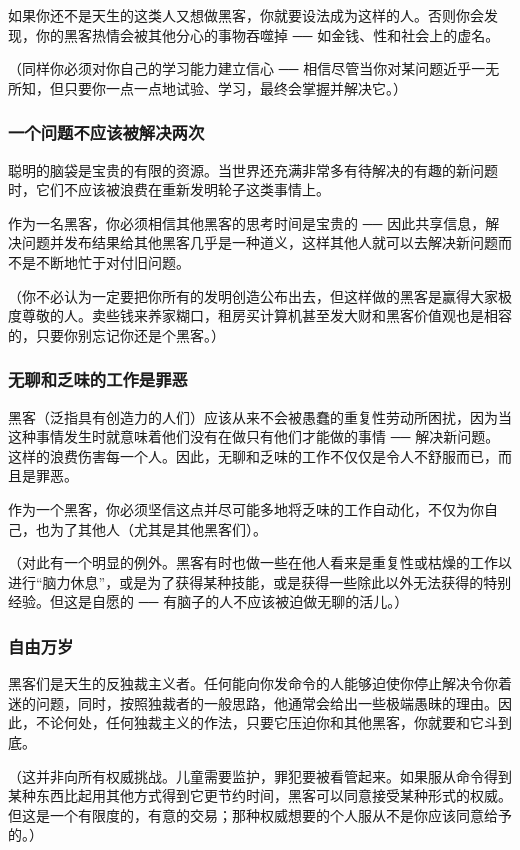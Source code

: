 如果你还不是天生的这类人又想做黑客，你就要设法成为这样的人。否则你会发现，你的黑客热情会被其他分心的事物吞噬掉 ── 如金钱、性和社会上的虚名。

（同样你必须对你自己的学习能力建立信心 ── 相信尽管当你对某问题近乎一无所知，但只要你一点一点地试验、学习，最终会掌握并解决它。）


\subsubsection{一个问题不应该被解决两次}
聪明的脑袋是宝贵的有限的资源。当世界还充满非常多有待解决的有趣的新问题时，它们不应该被浪费在重新发明轮子这类事情上。

作为一名黑客，你必须相信其他黑客的思考时间是宝贵的 ── 因此共享信息，解决问题并发布结果给其他黑客几乎是一种道义，这样其他人就可以去解决新问题而不是不断地忙于对付旧问题。

（你不必认为一定要把你所有的发明创造公布出去，但这样做的黑客是赢得大家极度尊敬的人。卖些钱来养家糊口，租房买计算机甚至发大财和黑客价值观也是相容的，只要你别忘记你还是个黑客。）


\subsubsection{无聊和乏味的工作是罪恶}
黑客（泛指具有创造力的人们）应该从来不会被愚蠢的重复性劳动所困扰，因为当这种事情发生时就意味着他们没有在做只有他们才能做的事情 ── 解决新问题。这样的浪费伤害每一个人。因此，无聊和乏味的工作不仅仅是令人不舒服而已，而且是罪恶。

作为一个黑客，你必须坚信这点并尽可能多地将乏味的工作自动化，不仅为你自己，也为了其他人（尤其是其他黑客们）。

（对此有一个明显的例外。黑客有时也做一些在他人看来是重复性或枯燥的工作以进行“脑力休息”，或是为了获得某种技能，或是获得一些除此以外无法获得的特别经验。但这是自愿的 ── 有脑子的人不应该被迫做无聊的活儿。）


\subsubsection{自由万岁}
黑客们是天生的反独裁主义者。任何能向你发命令的人能够迫使你停止解决令你着迷的问题，同时，按照独裁者的一般思路，他通常会给出一些极端愚昧的理由。因此，不论何处，任何独裁主义的作法，只要它压迫你和其他黑客，你就要和它斗到底。

（这并非向所有权威挑战。儿童需要监护，罪犯要被看管起来。如果服从命令得到某种东西比起用其他方式得到它更节约时间，黑客可以同意接受某种形式的权威。但这是一个有限度的，有意的交易；那种权威想要的个人服从不是你应该同意给予的。）

